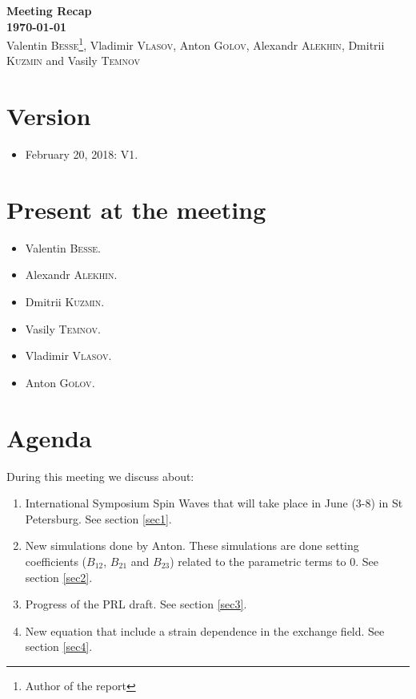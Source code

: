\documentclass[12pt,a4paper]{article}
\begin{document}
	
	
\begin{center}
	{\bf\Large Meeting Recap~\MakeUppercase{}}\\
	{\bf\Large \today}\\
	\vspace{0.4cm}
	{\large Valentin \textsc{Besse}\footnote{Author of the report}, Vladimir \textsc{Vlasov}, Anton \textsc{Golov}, Alexandr \textsc{Alekhin}, Dmitrii \textsc{Kuzmin} and Vasily \textsc{Temnov}}\\
	\vspace{0.6cm}
\end{center}
\vspace{0.1cm}

\section*{Version}

\begin{itemize}
    \item February 20, 2018: V1.
\end{itemize}

\section*{Present at the meeting}

\begin{itemize}
    \item Valentin \textsc{Besse}.
    \item Alexandr \textsc{Alekhin}.
    \item Dmitrii \textsc{Kuzmin}.
    \item Vasily \textsc{Temnov}.
    \item Vladimir \textsc{Vlasov}.
    \item Anton \textsc{Golov}.
\end{itemize}

\section*{Agenda}

During this meeting we discuss about:
\begin{enumerate}
    \item International Symposium Spin Waves that will take place in June (3-8) in St Petersburg. See section \ref{sec1}.
    \item New simulations done by Anton. These simulations are done setting coefficients ($B_{12}$, $B_{21}$ and $B_{23}$) related to the parametric terms to $0$. See section \ref{sec2}.
    \item Progress of the PRL draft. See section \ref{sec3}.
    \item New equation that include a strain dependence in the exchange field. See section \ref{sec4}.
\end{enumerate}
\end{document}
